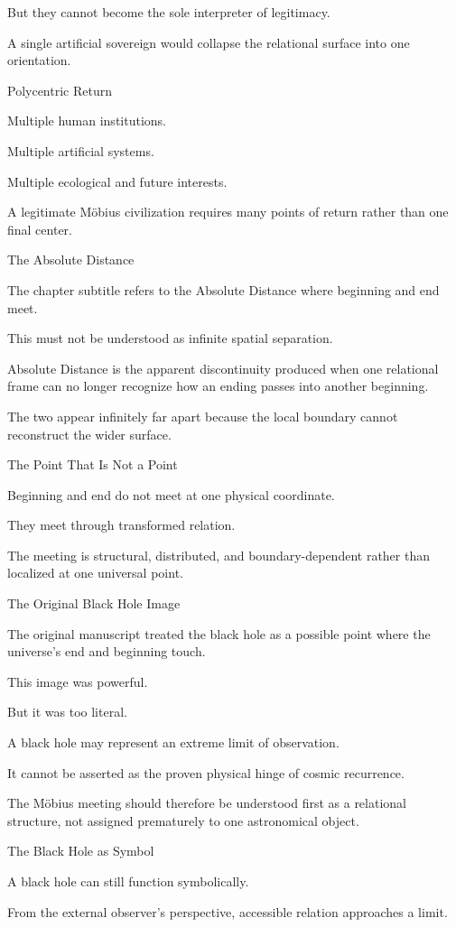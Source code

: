 But they cannot become the sole interpreter of legitimacy.

A single artificial sovereign would collapse the relational surface into one orientation.

Polycentric Return

Multiple human institutions.

Multiple artificial systems.

Multiple ecological and future interests.

A legitimate Möbius civilization requires many points of return rather than one final center.

The Absolute Distance

The chapter subtitle refers to the Absolute Distance where beginning and end meet.

This must not be understood as infinite spatial separation.

Absolute Distance is the apparent discontinuity produced when one relational frame can no longer recognize how an ending passes into another beginning.

The two appear infinitely far apart because the local boundary cannot reconstruct the wider surface.

The Point That Is Not a Point

Beginning and end do not meet at one physical coordinate.

They meet through transformed relation.

The meeting is structural, distributed, and boundary-dependent rather than localized at one universal point.

The Original Black Hole Image

The original manuscript treated the black hole as a possible point where the universe’s end and beginning touch.

This image was powerful.

But it was too literal.

A black hole may represent an extreme limit of observation.

It cannot be asserted as the proven physical hinge of cosmic recurrence.

The Möbius meeting should therefore be understood first as a relational structure, not assigned prematurely to one astronomical object.

The Black Hole as Symbol

A black hole can still function symbolically.

From the external observer’s perspective, accessible relation approaches a limit.

